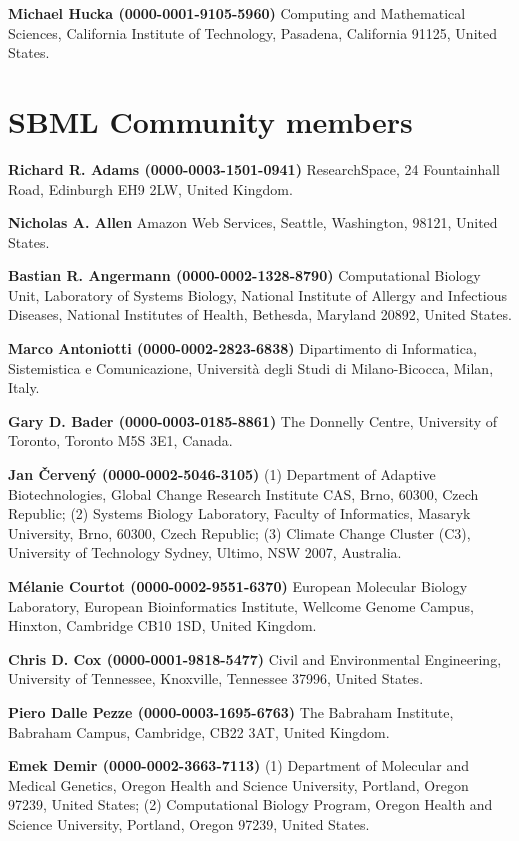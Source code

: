 \documentclass{sbml-paper}
\begin{document}
\textbf{Michael Hucka (0000-0001-9105-5960)} Computing and Mathematical Sciences, California Institute of Technology, Pasadena, California 91125, United States.


\section*{SBML Community members}

\textbf{Richard R. Adams (0000-0003-1501-0941)} ResearchSpace, 24 Fountainhall Road, Edinburgh EH9 2LW, United Kingdom.

\textbf{Nicholas A. Allen} Amazon Web Services, Seattle, Washington, 98121, United States.

\textbf{Bastian R. Angermann (0000-0002-1328-8790)} Computational Biology Unit, Laboratory of Systems Biology, National Institute of Allergy and Infectious Diseases, National Institutes of Health, Bethesda, Maryland 20892, United States.

\textbf{Marco Antoniotti (0000-0002-2823-6838)} Dipartimento di Informatica, Sistemistica e Comunicazione, Università degli Studi di Milano-Bicocca, Milan, Italy.

\textbf{Gary D. Bader (0000-0003-0185-8861)} The Donnelly Centre, University of Toronto, Toronto M5S 3E1, Canada.

\textbf{Jan Červený (0000-0002-5046-3105)} (1) Department of Adaptive Biotechnologies, Global Change Research Institute CAS, Brno, 60300, Czech Republic; (2) Systems Biology Laboratory, Faculty of Informatics, Masaryk University, Brno, 60300, Czech Republic; (3) Climate Change Cluster (C3), University of Technology Sydney, Ultimo, NSW 2007, Australia.

\textbf{Mélanie Courtot (0000-0002-9551-6370)} European Molecular Biology Laboratory, European Bioinformatics Institute, Wellcome Genome Campus, Hinxton, Cambridge CB10 1SD, United Kingdom.

\textbf{Chris D. Cox (0000-0001-9818-5477)} Civil and Environmental Engineering, University of Tennessee, Knoxville, Tennessee 37996, United States.

\textbf{Piero Dalle Pezze (0000-0003-1695-6763)} The Babraham Institute, Babraham Campus, Cambridge, CB22 3AT, United Kingdom.

\textbf{Emek Demir (0000-0002-3663-7113)} (1) Department of Molecular and Medical Genetics, Oregon Health and Science University, Portland, Oregon 97239, United States; (2) Computational Biology Program, Oregon Health and Science University, Portland, Oregon 97239, United States.
\end{document}
